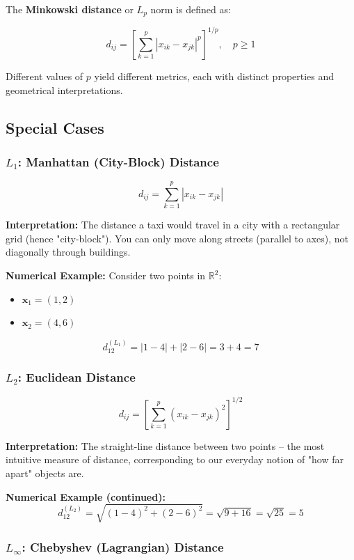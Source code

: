 \documentclass[11pt]{article}
\begin{document}
The \textbf{Minkowski distance} or $L_p$ norm is defined as:

$$d_{ij} = \left[\sum_{k=1}^{p} |x_{ik} - x_{jk}|^p\right]^{1/p}, \quad p \geq 1$$

Different values of $p$ yield different metrics, each with distinct properties and geometrical interpretations.

\subsection{Special Cases}

\subsubsection{$L_1$: Manhattan (City-Block) Distance}

$$d_{ij} = \sum_{k=1}^{p} |x_{ik} - x_{jk}|$$

\textbf{Interpretation:} The distance a taxi would travel in a city with a rectangular grid (hence "city-block"). You can only move along streets (parallel to axes), not diagonally through buildings.

\textbf{Numerical Example:} 
Consider two points in $\mathbb{R}^2$:
\begin{itemize}
    \item $\mathbf{x}_1 = (1, 2)$
    \item $\mathbf{x}_2 = (4, 6)$
\end{itemize}

$$d_{12}^{(L_1)} = |1-4| + |2-6| = 3 + 4 = 7$$

\subsubsection{$L_2$: Euclidean Distance}

$$d_{ij} = \left[\sum_{k=1}^{p} (x_{ik} - x_{jk})^2\right]^{1/2}$$

\textbf{Interpretation:} The straight-line distance between two points -- the most intuitive measure of distance, corresponding to our everyday notion of "how far apart" objects are.

\textbf{Numerical Example (continued):}
$$d_{12}^{(L_2)} = \sqrt{(1-4)^2 + (2-6)^2} = \sqrt{9 + 16} = \sqrt{25} = 5$$

\subsubsection{$L_\infty$: Chebyshev (Lagrangian) Distance}
\end{document}
